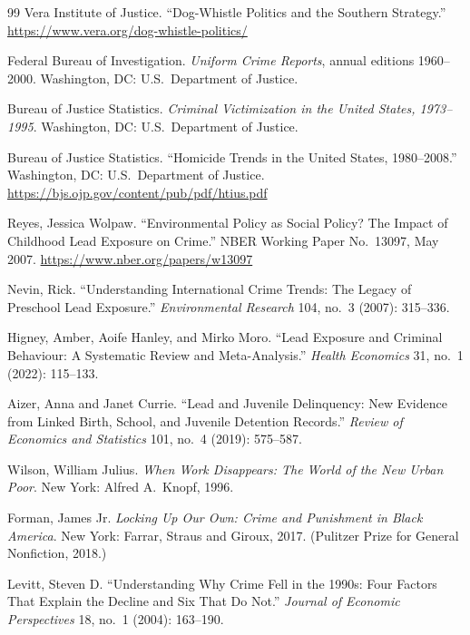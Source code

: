 \documentclass[12pt,openany]{book}
\begin{document}
\begin{thebibliography}{99}
Vera Institute of Justice. ``Dog-Whistle Politics and the Southern Strategy.'' \url{https://www.vera.org/dog-whistle-politics/}


Federal Bureau of Investigation. \textit{Uniform Crime Reports}, annual editions 1960--2000. Washington, DC: U.S.\ Department of Justice.

Bureau of Justice Statistics. \textit{Criminal Victimization in the United States, 1973--1995}. Washington, DC: U.S.\ Department of Justice.

Bureau of Justice Statistics. ``Homicide Trends in the United States, 1980--2008.'' Washington, DC: U.S.\ Department of Justice. \url{https://bjs.ojp.gov/content/pub/pdf/htius.pdf}

Reyes, Jessica Wolpaw. ``Environmental Policy as Social Policy? The Impact of Childhood Lead Exposure on Crime.'' NBER Working Paper No.\ 13097, May 2007. \url{https://www.nber.org/papers/w13097}

Nevin, Rick. ``Understanding International Crime Trends: The Legacy of Preschool Lead Exposure.'' \textit{Environmental Research} 104, no.\ 3 (2007): 315--336.

Higney, Amber, Aoife Hanley, and Mirko Moro. ``Lead Exposure and Criminal Behaviour: A Systematic Review and Meta-Analysis.'' \textit{Health Economics} 31, no.\ 1 (2022): 115--133.

Aizer, Anna and Janet Currie. ``Lead and Juvenile Delinquency: New Evidence from Linked Birth, School, and Juvenile Detention Records.'' \textit{Review of Economics and Statistics} 101, no.\ 4 (2019): 575--587.

Wilson, William Julius. \textit{When Work Disappears: The World of the New Urban Poor}. New York: Alfred A.\ Knopf, 1996.

Forman, James Jr. \textit{Locking Up Our Own: Crime and Punishment in Black America}. New York: Farrar, Straus and Giroux, 2017. (Pulitzer Prize for General Nonfiction, 2018.)

Levitt, Steven D. ``Understanding Why Crime Fell in the 1990s: Four Factors That Explain the Decline and Six That Do Not.'' \textit{Journal of Economic Perspectives} 18, no.\ 1 (2004): 163--190.


\end{thebibliography}
\end{document}
